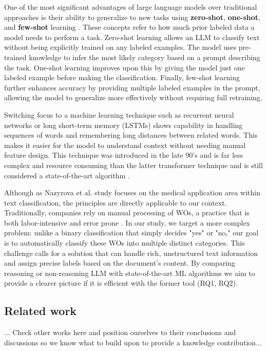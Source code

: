 One of the most significant advantages of large language models over traditional approaches is their ability to generalize to new tasks using \textbf{zero-shot}, \textbf{one-shot}, and \textbf{few-shot} learning \cite{brown2020language}. These concepts refer to how much prior labeled data a model needs to perform a task. Zero-shot learning allows an LLM to classify text without being explicitly trained on any labeled examples. The model uses pre-trained knowledge to infer the most likely category based on a prompt describing the task. One-shot learning improves upon this by giving the model just one labeled example before making the classification. Finally, few-shot learning further enhances accuracy by providing multiple labeled examples in the prompt, allowing the model to generalize more effectively without requiring full retraining.

Switching focus to a machine learning technique such as recurrent neural networks or long short-term memory (LSTMs) shows capability in handling sequences of words and remembering long distances between related words. This makes it easier for the model to understand context without needing manual feature design. This technique was introduced in the late 90's and is far less complex and resource consuming than the latter transformer technique and is still considered a state-of-the-art algorithm \cite{wang2024classifiers} \cite{hochreiter1997long}.

Although as Nazyrova et al. \cite{nazyrova2024medical} study focuses on the medical application area within text classification, the principles are directly applicable to our context.  Traditionally, companies rely on manual processing of WOs, a practice that is both labor-intensive and error prone \cite{li2024work}. In our study, we target a more complex problem: unlike a binary classification that simply decides "yes" or "no," our goal is to automatically classify these WOs into multiple distinct categories. This challenge calls for a solution that can handle rich, unstructured text information and assign precise labels based on the document’s content. By comparing reasoning or non-reasoning LLM with state-of-the-art ML algorithms we aim to provide a clearer picture if it is efficient with the former tool (RQ1, RQ2).

\subsection{Related work}

... Check other works here and position ourselves to their conclusions and discussions so we know what to build upon to provide a knowledge contribution...

